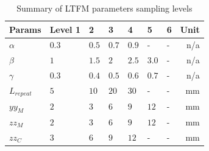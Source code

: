             
            \begin{table}
                \renewcommand{\arraystretch}{1.2}
                \caption{Summary of \acs{LTFM} parameters sampling levels}
                \label{table:chap/rsm/LTFM/design level}
                \centering
                    \begin{tabular}{@{}l l l l l l l r@{}}
                    \hline
                    \bfseries Params & \bfseries Level 1 & \bfseries 2 & \bfseries 3 & \bfseries 4 & \bfseries 5 & \bfseries 6 & \bfseries Unit \\
                    \hline
                        $\alpha$	    &   $0.3$   &   $0.5$   &   $0.7$   &   $0.9$ 	&   -       &   -   &n/a\\ 
                        
                        $\beta$	        &   $1$     &   $1.5$   &   $2$ 	&   $2.5$   &  $3.0$    &   -   &n/a\\ 
                        
                        $\gamma$	    &   $0.3$   &   $0.4$   &   $0.5$   &   $0.6$ 	&  $0.7$    &   -   &n/a\\ 
                        
                        $L_{repeat}$	&   $5$     &   $10$    &   $20$    &   $30$ 	&   -       &   -   &$\mathrm{mm}$\\ 
                        
                        $yy_M$	        & 	$2$     &   $3$     &   $6$     &   $9$ 	&	$12$    &   -   &$\mathrm{mm}$\\ 
                        
                        $zz_M$	        & 	$2$     &   $3$     &   $6$     &   $9$ 	&	$12$    &   -   &$\mathrm{mm}$\\ 
                        
                        $zz_C$	        & 	$3$     &   $6$     &   $9$     &   $12$ 	&   -       &   -   &$\mathrm{mm}$\\ 
                        
                    \hline
                    \end{tabular}
            \end{table}
        
        

